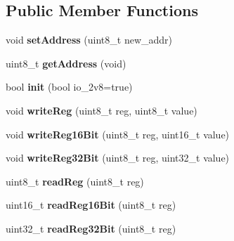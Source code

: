 \subsection*{Public Member Functions}
\begin{DoxyCompactItemize}
\item 
void {\bfseries set\+Address} (uint8\+\_\+t new\+\_\+addr)\hypertarget{class_v_l53_l0_x_a5fafb26368ff871653f4b56e060606fa}{}\label{class_v_l53_l0_x_a5fafb26368ff871653f4b56e060606fa}

\item 
uint8\+\_\+t {\bfseries get\+Address} (void)\hypertarget{class_v_l53_l0_x_a4bc871502a5635943e3bc5ce06599105}{}\label{class_v_l53_l0_x_a4bc871502a5635943e3bc5ce06599105}

\item 
bool {\bfseries init} (bool io\+\_\+2v8=true)\hypertarget{class_v_l53_l0_x_a2bd7f966631ee954fd1c4119f901b240}{}\label{class_v_l53_l0_x_a2bd7f966631ee954fd1c4119f901b240}

\item 
void {\bfseries write\+Reg} (uint8\+\_\+t reg, uint8\+\_\+t value)\hypertarget{class_v_l53_l0_x_a607bdb2d634b1ec3878dbaee6d83402e}{}\label{class_v_l53_l0_x_a607bdb2d634b1ec3878dbaee6d83402e}

\item 
void {\bfseries write\+Reg16\+Bit} (uint8\+\_\+t reg, uint16\+\_\+t value)\hypertarget{class_v_l53_l0_x_ade0f7181294f755fedd269253a3c4bb4}{}\label{class_v_l53_l0_x_ade0f7181294f755fedd269253a3c4bb4}

\item 
void {\bfseries write\+Reg32\+Bit} (uint8\+\_\+t reg, uint32\+\_\+t value)\hypertarget{class_v_l53_l0_x_aa67924fc9b90b086d667a92bd3195921}{}\label{class_v_l53_l0_x_aa67924fc9b90b086d667a92bd3195921}

\item 
uint8\+\_\+t {\bfseries read\+Reg} (uint8\+\_\+t reg)\hypertarget{class_v_l53_l0_x_a44cad5c80035df82bdc1c28894ac714e}{}\label{class_v_l53_l0_x_a44cad5c80035df82bdc1c28894ac714e}

\item 
uint16\+\_\+t {\bfseries read\+Reg16\+Bit} (uint8\+\_\+t reg)\hypertarget{class_v_l53_l0_x_afa23131ef0c5edc982a3d9ab843fefc8}{}\label{class_v_l53_l0_x_afa23131ef0c5edc982a3d9ab843fefc8}

\item 
uint32\+\_\+t {\bfseries read\+Reg32\+Bit} (uint8\+\_\+t reg)\hypertarget{class_v_l53_l0_x_a8e6edc19a09bff41ac070d22204ce5db}{}\label{class_v_l53_l0_x_a8e6edc19a09bff41ac070d22204ce5db}


\end{DoxyCompactItemize}
